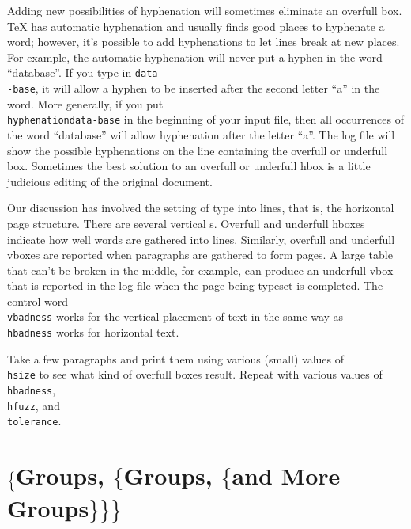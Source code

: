 Adding new possibilities of hyphenation will sometimes eliminate 
an overfull box. \TeX{} has automatic hyphenation and usually 
finds good places to hyphenate a word; however, it's possible to 
add hyphenations to let lines break at new places.  For example, 
the automatic hyphenation will never put a hyphen in the word 
``database''.  If you type in {\tt data\\-base}, it will allow a 
hyphen to be inserted after the second letter ``a'' in the word. 
More generally, if you put {\tt \\hyphenation\lb data-base\rb} in 
the beginning of your input file, then all occurrences of the 
word ``database'' will allow hyphenation after the letter ``a''. 
 The log file will show the possible hyphenations on 
the line containing the overfull or underfull box. Sometimes the 
best solution to an overfull or underfull hbox is a little 
judicious editing of the original document. 
 
Our discussion has involved the setting of type into lines, that is, 
the horizontal page structure.  There are several vertical \analog{}s. 
Overfull and underfull hboxes indicate how well words are gathered 
into lines.  Similarly, overfull and underfull vboxes are reported 
when paragraphs are gathered to form pages.  A large table that 
can't be broken in the middle, for example, can produce an underfull 
vbox that is reported in the log file when the page being typeset is 
completed.  The control word {\tt \\vbadness} works for the vertical 
placement of text in the same way as {\tt \\hbadness} works for 
horizontal text. 
 
\exercise Take a few paragraphs and print them using various (small) 
values of {\tt \\hsize} to see what kind of overfull boxes result. 
Repeat with various values of {\tt \\hbadness}, {\tt \\hfuzz}, and 
{\tt \\tolerance}. 
 
 
 
 
 
 
\section{$\Bigl\{$Groups, $\bigl\{$Groups, 
        $\{$and More Groups$\}\bigr\}\Bigr\}$} 
 

